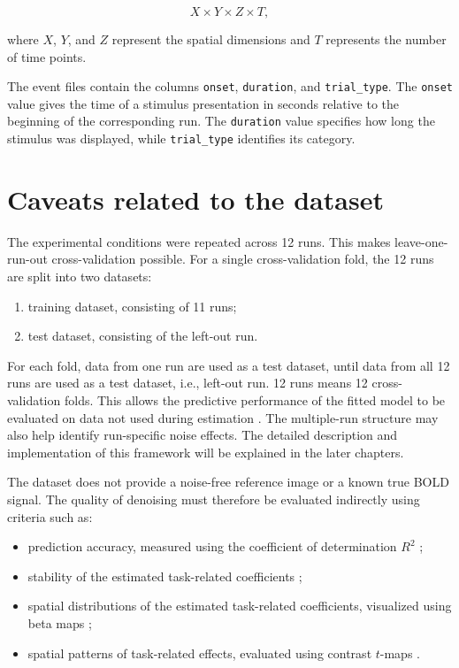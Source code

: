 \documentclass[english]{pwr_wmat_praca_dyplomowa}
\theoremstyle{definition}
\theoremstyle{remark}
\begin{document}
\begin{equation}
    \label{eq:init-data-shape}
    X \times Y \times Z \times T,
\end{equation}

where $X$, $Y$, and $Z$ represent the spatial dimensions and $T$ represents the number of time points.

The event files contain the columns \verb|onset|, \verb|duration|, and \verb|trial_type|. The \verb|onset| value gives the time of a stimulus presentation in seconds relative to the beginning of the corresponding run. The \verb|duration| value specifies how long the stimulus was displayed, while \verb|trial_type| identifies its category.

\section{Caveats related to the dataset}
\label{section:caveats}

The experimental conditions were repeated across 12 runs. This makes leave-one-run-out cross-validation possible. For a single cross-validation fold, the 12 runs are split into two datasets:
\begin{enumerate}
    \item training dataset, consisting of 11 runs;
    \item test dataset, consisting of the left-out run.
\end{enumerate}
For each fold, data from one run are used as a test dataset, until data from all 12 runs are used as a test dataset, i.e., left-out run. 12 runs means 12 cross-validation folds. This allows the predictive performance of the fitted model to be evaluated on data not used during estimation \cite{glm-denoise}. The multiple-run structure may also help identify run-specific noise effects. The detailed description and implementation of this framework will be explained in the later chapters.

The dataset does not provide a noise-free reference image or a known true BOLD signal. The quality of denoising must therefore be evaluated indirectly using criteria such as:
\begin{itemize}
    \item prediction accuracy, measured using the coefficient of determination $R^2$ \cite{coefficient-determination};
    \item stability of the estimated task-related coefficients \cite{jackknife};
    \item spatial distributions of the estimated task-related coefficients, visualized using beta maps \cite{spm-filter};
    \item spatial patterns of task-related effects, evaluated using contrast $t$-maps \cite{tmaps}.
\end{itemize}
\end{document}
